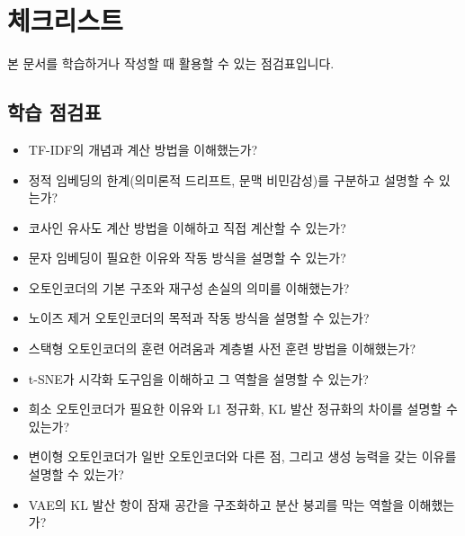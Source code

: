 \documentclass[11pt,a4paper]{article}
\theoremstyle{definition}
\begin{document}
\newpage
\section{체크리스트}
본 문서를 학습하거나 작성할 때 활용할 수 있는 점검표입니다.

\subsection{학습 점검표}
\begin{itemize}
    \item TF-IDF의 개념과 계산 방법을 이해했는가?
    \item 정적 임베딩의 한계(의미론적 드리프트, 문맥 비민감성)를 구분하고 설명할 수 있는가?
    \item 코사인 유사도 계산 방법을 이해하고 직접 계산할 수 있는가?
    \item 문자 임베딩이 필요한 이유와 작동 방식을 설명할 수 있는가?
    \item 오토인코더의 기본 구조와 재구성 손실의 의미를 이해했는가?
    \item 노이즈 제거 오토인코더의 목적과 작동 방식을 설명할 수 있는가?
    \item 스택형 오토인코더의 훈련 어려움과 계층별 사전 훈련 방법을 이해했는가?
    \item t-SNE가 시각화 도구임을 이해하고 그 역할을 설명할 수 있는가?
    \item 희소 오토인코더가 필요한 이유와 L1 정규화, KL 발산 정규화의 차이를 설명할 수 있는가?
    \item 변이형 오토인코더가 일반 오토인코더와 다른 점, 그리고 생성 능력을 갖는 이유를 설명할 수 있는가?
    \item VAE의 KL 발산 항이 잠재 공간을 구조화하고 분산 붕괴를 막는 역할을 이해했는가?
\end{itemize}
\end{document}
